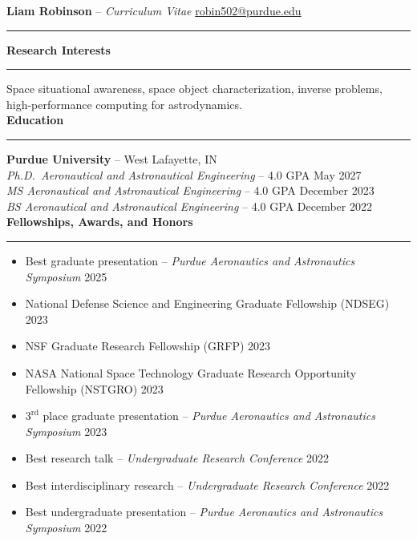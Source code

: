 \documentclass[10pt, a4paper]{article}
\newcommand{\sectiontitle}[1]{{\Large \textbf{#1}}\vspace{0.5em}\hrule\vspace{0.5em}}
\begin{document}
\thispagestyle{empty}



\noindent
\textbf{\huge Liam Robinson }{\huge -- }\textit{\huge Curriculum Vitae} \hfill \href{mailto:robin502@purdue.edu}{robin502@purdue.edu}
\rule{\linewidth}{4pt}
\vspace{-0.5em}

\sectiontitle{Research Interests}

Space situational awareness, space object characterization, inverse problems, high-performance computing for astrodynamics. \\

\sectiontitle{Education}
\textbf{Purdue University} -- West Lafayette, IN \\
\textit{Ph.D.\ Aeronautical and Astronautical Engineering} -- 4.0 GPA \hfill May 2027 \\
\textit{MS Aeronautical and Astronautical Engineering} -- 4.0 GPA \hfill December 2023 \\
\textit{BS Aeronautical and Astronautical Engineering} -- 4.0 GPA \hfill December 2022 \\

\sectiontitle{Fellowships, Awards, and Honors}
\begin{itemize}[noitemsep]
    \item Best graduate presentation -- \textit{Purdue Aeronautics and Astronautics Symposium} \hfill 2025
    \item National Defense Science and Engineering Graduate Fellowship (NDSEG) \hfill 2023
    \item NSF Graduate Research Fellowship (GRFP) \hfill 2023
    \item NASA National Space Technology Graduate Research Opportunity Fellowship (NSTGRO) \hfill 2023
    \item $3^\text{rd}$ place graduate presentation -- \textit{Purdue Aeronautics and Astronautics Symposium} \hfill 2023
    \item Best research talk -- \textit{Undergraduate Research Conference} \hfill 2022
    \item Best interdisciplinary research -- \textit{Undergraduate Research Conference} \hfill 2022
    \item Best undergraduate presentation -- \textit{Purdue Aeronautics and Astronautics Symposium} \hfill 2022
\end{itemize}
\end{document}
